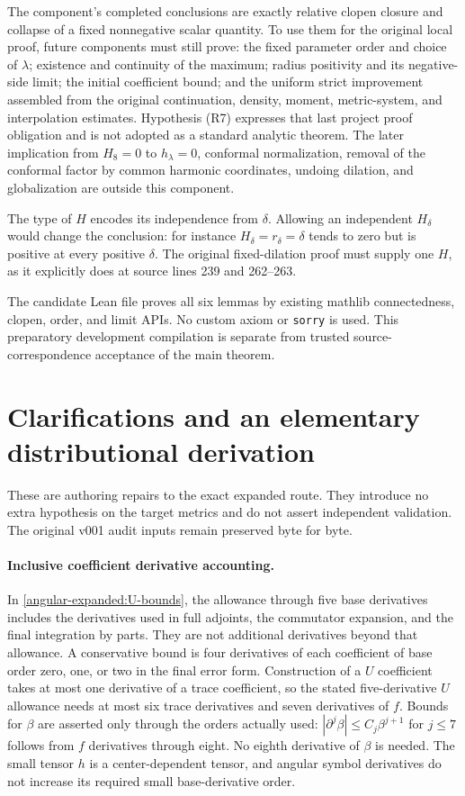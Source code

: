 \documentclass[11pt]{article}
\theoremstyle{definition}
\theoremstyle{remark}
\numberwithin{equation}{section}
\begin{document}
The component's completed conclusions are exactly relative clopen
closure and collapse of a fixed nonnegative scalar quantity.  To use
them for the original local proof, future components must still prove:
the fixed parameter order and choice of $\lambda$; existence and
continuity of the maximum; radius positivity and its negative-side
limit; the initial coefficient bound; and the uniform strict
improvement assembled from the original continuation, density,
moment, metric-system, and interpolation estimates.  Hypothesis (R7)
expresses that last project proof obligation and is not adopted as a
standard analytic theorem.  The later implication from $H_8=0$ to
$h_\lambda=0$, conformal normalization, removal of the conformal factor
by common harmonic coordinates, undoing dilation, and globalization
are outside this component.

The type of $H$ encodes its independence from $\delta$.  Allowing an
independent $H_\delta$ would change the conclusion: for instance
$H_\delta=r_\delta=\delta$ tends to zero but is positive at every
positive $\delta$.  The original fixed-dilation proof must supply
one $H$, as it explicitly does at source lines 239 and 262--263.

The candidate Lean file proves all six lemmas by existing mathlib
connectedness, clopen, order, and limit APIs.  No custom axiom or
\texttt{sorry} is used.  This preparatory development compilation is
separate from trusted source-correspondence acceptance of the main
theorem.

\clearpage
\section{Clarifications and an elementary distributional derivation}
\label{core-repairs:section}

These are authoring repairs to the exact expanded route. They introduce no
extra hypothesis on the target metrics and do not assert independent
validation. The original v001 audit inputs remain preserved byte for byte.

\paragraph{Inclusive coefficient derivative accounting.}
In \eqref{angular-expanded:U-bounds}, the allowance through five base
derivatives includes the derivatives used in full adjoints, the commutator
expansion, and the final integration by parts. They are not additional
derivatives beyond that allowance. A conservative bound is four derivatives
of each coefficient of base order zero, one, or two in the final error
form. Construction of a $U$ coefficient takes at most one derivative of a
trace coefficient, so the stated five-derivative $U$ allowance needs at
most six trace derivatives and seven derivatives of $f$. Bounds for
$\beta$ are asserted only through the orders actually used:
$|\partial^j\beta|\le C_j\beta^{j+1}$ for $j\le7$ follows from $f$
derivatives through eight. No eighth derivative of $\beta$ is needed.
The small tensor $h$ is a center-dependent tensor, and angular symbol
derivatives do not increase its required small base-derivative order.
\end{document}
